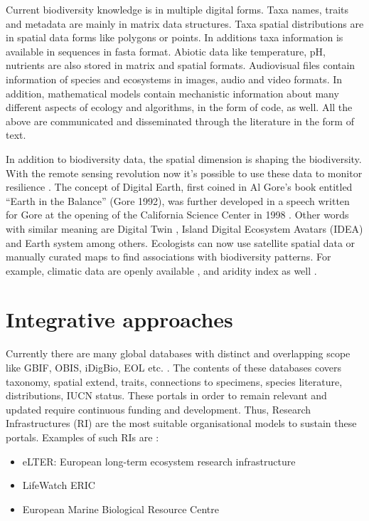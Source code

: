 Current biodiversity knowledge is in multiple digital forms. 
Taxa names, traits and metadata are mainly in matrix data
structures. Taxa spatial distributions are in spatial data
forms like polygons or points. In additions taxa information
is available in sequences in fasta format. Abiotic data like 
temperature, pH, nutrients are also stored in matrix
and spatial formats. Audiovisual files contain information
of species and ecosystems in images, audio and video formats.
In addition, mathematical models contain mechanistic information
about many different aspects of ecology and algorithms, in the 
form of code, as well. All the above are communicated and disseminated through the
literature in the form of text.

In addition to biodiversity data, the spatial dimension is shaping the biodiversity.
With the remote sensing revolution now
it's possible to use these data to monitor resilience \parencite{Lenton2022resilience}. 
The concept of Digital Earth, first coined in Al Gore’s book entitled 
“Earth in the Balance” (Gore 1992), was further developed in a speech
written for Gore at the opening of the California Science Center in 1998 \parencite{Goodchild_2012}. Other words with
similar meaning are Digital Twin \parencite{barros2024digital},
Island Digital Ecosystem Avatars (IDEA) \parencite{Davies2016} and
Earth system \parencite{mahecha2020earth} among others.
Ecologists can now use satellite spatial data or manually curated maps 
to find associations with biodiversity patterns. 
For example, climatic data are openly available \parencite{Fick2017}, 
and aridity index as well \parencite{zomer2022version}.

\section{Integrative approaches}
\label{sec:approachintegration}

Currently there are many global databases with distinct and overlapping 
scope like GBIF, OBIS, iDigBio, EOL etc. \parencite{feng2022Review}. 
The contents of these databases covers taxonomy, spatial extend, traits, 
connections to specimens, species literature, distributions,
IUCN status. These portals in order to remain relevant and updated require 
continuous funding and development. Thus, Research Infrastructures (RI) are 
the most suitable organisational models to sustain these portals. Examples 
of such RIs are :

\begin{itemize}

    \item eLTER: European long-term ecosystem research infrastructure 
    \item LifeWatch ERIC
    \item European Marine Biological Resource Centre

\end{itemize}

